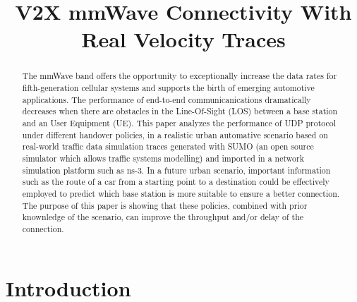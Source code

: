 \documentclass[conference,10pt]{IEEEtran}
\begin{document}
\title{V2X mmWave Connectivity With Real Velocity Traces}

\author{
}

\maketitle

\begin{abstract}
The mmWave band offers the opportunity to exceptionally increase the data rates for fifth-generation cellular systems and supports the birth of emerging automotive applications. The performance of end-to-end communicanications dramatically decreases when there are obstacles in the Line-Of-Sight (LOS) between a base station and an User Equipment (UE).
This paper analyzes the performance of UDP protocol under different handover policies, in a realistic urban automative scenario based on real-world traffic data simulation traces generated with SUMO (an open source simulator which allows traffic systems modelling) and imported in a network simulation platform such as ns-3. In a future urban scenario, important information such as the route of a car from a starting point to a destination could be effectively employed to predict which base station is more suitable to ensure a better connection. The purpose of this paper is showing that these policies, combined with prior knownledge of the scenario, can improve the throughput and/or delay of the connection.
\end{abstract}

\section{Introduction}\label{sec:intro}
\end{document}
